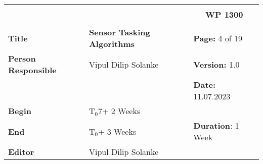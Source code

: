 \begin{table}[!h]
  \begin{center}
    \begin{tabular}{|p{35mm}||p{55mm}|p{50mm}||p{40mm}|}
      \hline
      \multicolumn{3}{|l||}{\textbf{}} & \multicolumn{1}{c|}{}                                                                                                                                                \\
      \multicolumn{3}{|l||}{\textbf{}} & \multicolumn{1}{c|}{\textbf{WP 1300}}                                                                                                                                \\
      \multicolumn{3}{|l||}{\textbf{}} & \multicolumn{1}{c|}{}                                                                                                                                                \\
      \hline\hline
      \textbf{Title}                   & \multicolumn{2}{p{7cm}||}{\textbf{Sensor Tasking Algorithms}}
                                       & \textbf{Page:} 4 of 19                                                                                                                                             \\
      \hline
      \textbf{Person Responsible}        & \multicolumn{2}{l||}{Vipul Dilip Solanke}                                                                                                   & \textbf{Version:} 1.0   \\
      \hline
      \multicolumn{3}{|l||}{}          & \textbf{Date:} 11.07.2023                                                                                                                                          \\
      \hline\hline
      \textbf{Begin}                  & \multicolumn{2}{l||}{T$_0$7+ 2 Weeks}                                                                                                                &                         \\
      \hline
      \textbf{End}                    & \multicolumn{2}{l||}{T$_0$+ 3 Weeks}                                                                                                        & \textbf{Duration}: 1 Week \\
      \hline\hline
      \textbf{Editor}              & \multicolumn{3}{l|}{Vipul Dilip Solanke}                                                                                                                              \\

\end{tabular}
\end{center}
\end{table}

